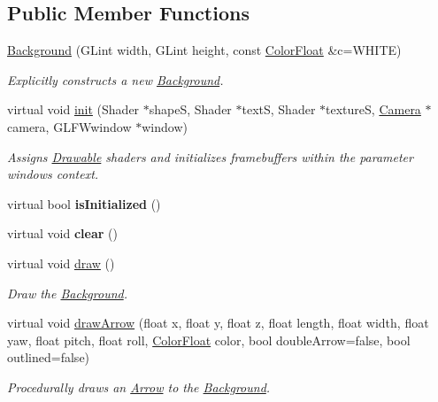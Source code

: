 \subsection*{Public Member Functions}
\begin{DoxyCompactItemize}
\item 
\hyperlink{classtsgl_1_1_background_a2cdb442cc62469acc31f6707ba96bea2}{Background} (G\+Lint width, G\+Lint height, const \hyperlink{structtsgl_1_1_color_float}{Color\+Float} \&c=W\+H\+I\+TE)
\begin{DoxyCompactList}\small\item\em Explicitly constructs a new \hyperlink{classtsgl_1_1_background}{Background}. \end{DoxyCompactList}\item 
virtual void \hyperlink{classtsgl_1_1_background_ae80545e3e31a4e5ec9d2796fc4f66ee8}{init} (Shader $\ast$shapeS, Shader $\ast$textS, Shader $\ast$textureS, \hyperlink{classtsgl_1_1_camera}{Camera} $\ast$camera, G\+L\+F\+Wwindow $\ast$window)
\begin{DoxyCompactList}\small\item\em Assigns \hyperlink{classtsgl_1_1_drawable}{Drawable} shaders and initializes framebuffers within the parameter window\textquotesingle{}s context. \end{DoxyCompactList}\item 
\mbox{\label{classtsgl_1_1_background_ac2e5da31b6e5394f5986bc5b3092e541}} 
virtual bool {\bfseries is\+Initialized} ()
\item 
\mbox{\label{classtsgl_1_1_background_a7a5051f73ca960357676cb1c212db114}} 
virtual void {\bfseries clear} ()
\item 
virtual void \hyperlink{classtsgl_1_1_background_a62314d455c7b09b2686ba46fd1e5c663}{draw} ()
\begin{DoxyCompactList}\small\item\em Draw the \hyperlink{classtsgl_1_1_background}{Background}. \end{DoxyCompactList}\item 
virtual void \hyperlink{classtsgl_1_1_background_af25348ef85f3b242e754a5aaae497b77}{draw\+Arrow} (float x, float y, float z, float length, float width, float yaw, float pitch, float roll, \hyperlink{structtsgl_1_1_color_float}{Color\+Float} color, bool double\+Arrow=false, bool outlined=false)
\begin{DoxyCompactList}\small\item\em Procedurally draws an \hyperlink{classtsgl_1_1_arrow}{Arrow} to the \hyperlink{classtsgl_1_1_background}{Background}. \end{DoxyCompactList}\item 

\end{DoxyCompactItemize}
